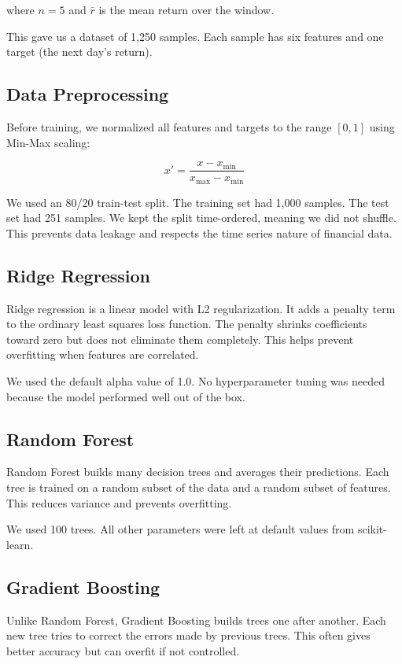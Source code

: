 \documentclass[12pt,a4paper]{article}
\begin{document}
where $n=5$ and $\bar{r}$ is the mean return over the window.

This gave us a dataset of 1,250 samples. Each sample has six features and one target (the next day's return).

\subsection{Data Preprocessing}
Before training, we normalized all features and targets to the range $[0, 1]$ using Min-Max scaling:

\begin{equation}
x' = \frac{x - x_{\min}}{x_{\max} - x_{\min}}
\end{equation}

We used an 80/20 train-test split. The training set had 1,000 samples. The test set had 251 samples. We kept the split time-ordered, meaning we did not shuffle. This prevents data leakage and respects the time series nature of financial data.

\subsection{Ridge Regression}
Ridge regression is a linear model with L2 regularization. It adds a penalty term to the ordinary least squares loss function. The penalty shrinks coefficients toward zero but does not eliminate them completely. This helps prevent overfitting when features are correlated.

We used the default alpha value of 1.0. No hyperparameter tuning was needed because the model performed well out of the box.

\subsection{Random Forest}
Random Forest builds many decision trees and averages their predictions. Each tree is trained on a random subset of the data and a random subset of features. This reduces variance and prevents overfitting.

We used 100 trees. All other parameters were left at default values from scikit-learn.

\subsection{Gradient Boosting}
Unlike Random Forest, Gradient Boosting builds trees one after another. Each new tree tries to correct the errors made by previous trees. This often gives better accuracy but can overfit if not controlled.
\end{document}
